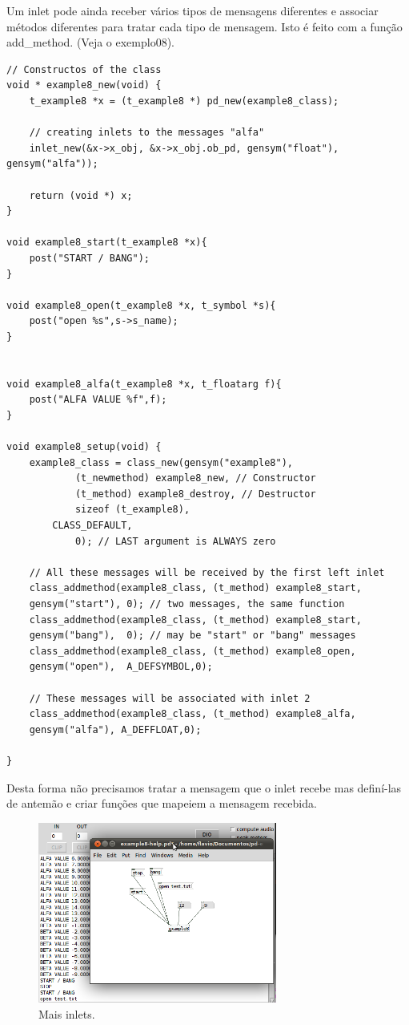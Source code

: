 \documentclass[10pt,a4paper]{report}
\begin{document}
Um inlet pode ainda receber vários tipos de mensagens diferentes e associar métodos diferentes para tratar cada tipo de mensagem. Isto é feito com a função add\_method.  (Veja o exemplo08).

\begin{lstlisting}
// Constructos of the class
void * example8_new(void) {
    t_example8 *x = (t_example8 *) pd_new(example8_class);

    // creating inlets to the messages "alfa"
    inlet_new(&x->x_obj, &x->x_obj.ob_pd, gensym("float"), gensym("alfa"));

    return (void *) x;
}

void example8_start(t_example8 *x){
    post("START / BANG");
}

void example8_open(t_example8 *x, t_symbol *s){
    post("open %s",s->s_name);
}


void example8_alfa(t_example8 *x, t_floatarg f){
	post("ALFA VALUE %f",f);
}

void example8_setup(void) {
    example8_class = class_new(gensym("example8"),
            (t_newmethod) example8_new, // Constructor
            (t_method) example8_destroy, // Destructor
            sizeof (t_example8),
	    CLASS_DEFAULT,
            0); // LAST argument is ALWAYS zero

    // All these messages will be received by the first left inlet
    class_addmethod(example8_class, (t_method) example8_start, 
	gensym("start"), 0); // two messages, the same function
    class_addmethod(example8_class, (t_method) example8_start, 
	gensym("bang"),  0); // may be "start" or "bang" messages
    class_addmethod(example8_class, (t_method) example8_open,  
	gensym("open"),  A_DEFSYMBOL,0);

    // These messages will be associated with inlet 2
    class_addmethod(example8_class, (t_method) example8_alfa,  
	gensym("alfa"), A_DEFFLOAT,0); 

}
\end{lstlisting}

Desta forma não precisamos tratar a mensagem que o inlet recebe mas definí-las de antemão e criar funções que mapeiem a mensagem recebida.

\begin{figure}[h!]
	\centering
	\includegraphics[width=0.7\textwidth]{example8}
	\caption{Mais inlets.}
\end{figure}
\end{document}
